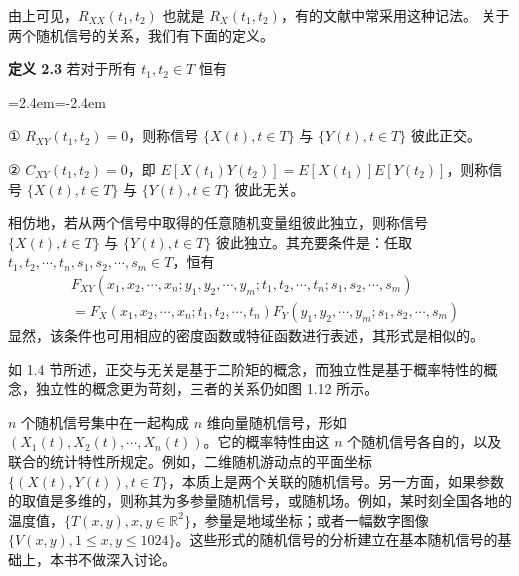 \documentclass[11pt,openany,UTF8]{ctexbook}
\newcommand{\R}{\mathbb{R}}                        %
\newcommand{\thm}[1]{\par\medskip\noindent\textbf{#1}\quad}
\newenvironment{citemize}
  {\begin{list}{}{\leftmargin=2.4em\itemindent=-2.4em\itemsep=1pt\topsep=3pt\parsep=0pt}}
  {\end{list}}
\begin{document}
由上可见\nobreak，$R_{XX}(t_1,t_2)$ 也就是 $R_X(t_1,t_2)$\nobreak，有的文献中常采用这种记法\nobreak。%
关于两个随机信号的关系\nobreak，我们有下面的定义\nobreak。

\thm{定义 2.3} 若对于所有 $t_1,t_2\in T$ 恒有
\begin{citemize}
\item ① $R_{XY}(t_1,t_2)=0$\nobreak，则称信号 $\{X(t),t\in T\}$ 与 $\{Y(t),t\in T\}$ 彼此正交\nobreak。
\item ② $C_{XY}(t_1,t_2)=0$\nobreak，即 $E[X(t_1)Y(t_2)]=E[X(t_1)]E[Y(t_2)]$\nobreak，则称信号 $\{X(t),t\in T\}$ 与 $\{Y(t),t\in T\}$ 彼此无关\nobreak。
\end{citemize}

相仿地\nobreak，若从两个信号中取得的任意随机变量组彼此独立\nobreak，则称信号 $\{X(t),t\in T\}$ 与 $\{Y(t),t\in T\}$ 彼此独立\nobreak。其充要条件是\nobreak：任取 $t_1,t_2,\allowbreak\cdots,t_n,\allowbreak s_1,s_2,\allowbreak\cdots,s_m\in T$\nobreak，恒有
\[
\begin{aligned}
&F_{XY}(x_1,x_2,\cdots,x_n;y_1,y_2,\cdots,y_m;t_1,t_2,\cdots,t_n;s_1,s_2,\cdots,s_m)\\
&=F_X(x_1,x_2,\cdots,x_n;t_1,t_2,\cdots,t_n)F_Y(y_1,y_2,\cdots,y_m;s_1,s_2,\cdots,s_m)
\end{aligned}
\]
显然\nobreak，该条件也可用相应的密度函数或特征函数进行表述\nobreak，其形式是相似的\nobreak。

如 1.4 节所述\nobreak，正交与无关是基于二阶矩的概念\nobreak，而独立性是基于概率特性的概念\nobreak，独立性的概念更为苛刻\nobreak，三者的关系仍如图 1.12 所示\nobreak。

$n$ 个随机信号集中在一起构成 $n$ 维向量随机信号\nobreak，形如 $(X_1(t),X_2(t),\allowbreak\cdots,\allowbreak X_n(t))$\nobreak。它的概率特性由这 $n$ 个随机信号各自的\nobreak，以及联合的统计特性所规定\nobreak。例如\nobreak，二维随机游动点的平面坐标 $\{(X(t),Y(t)),t\in T\}$\nobreak，本质上是两个关联的随机信号\nobreak。另一方面\nobreak，如果参数的取值是多维的\nobreak，则称其为多参量随机信号\nobreak，或随机场\nobreak。例如\nobreak，某时刻全国各地的温度值\nobreak，$\{T(x,y),x,y\in\R^2\}$\nobreak，参量是地域坐标\nobreak；或者一幅数字图像 $\{V(x,y),1\leqslant x,y\leqslant 1024\}$\nobreak。这些形式的随机信号的分析建立在基本随机信号的基础上\nobreak，本书不做深入讨论\nobreak。
\end{document}
